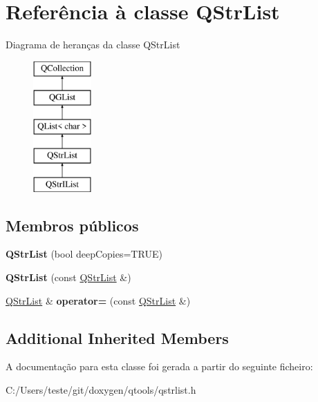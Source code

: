 \hypertarget{class_q_str_list}{\section{Referência à classe Q\-Str\-List}
\label{class_q_str_list}
}
Diagrama de heranças da classe Q\-Str\-List\begin{figure}[H]
\begin{center}
\leavevmode
\includegraphics[height=5.000000cm]{class_q_str_list}
\end{center}
\end{figure}
\subsection*{Membros públicos}
\begin{DoxyCompactItemize}
\item 
\hypertarget{class_q_str_list_ad8d73df8f9e1af4f6f048bbc94b7200c}{{\bfseries Q\-Str\-List} (bool deep\-Copies=T\-R\-U\-E)}\label{class_q_str_list_ad8d73df8f9e1af4f6f048bbc94b7200c}

\item 
\hypertarget{class_q_str_list_aa8804f456706a2405532d0fd797b6795}{{\bfseries Q\-Str\-List} (const \hyperlink{class_q_str_list}{Q\-Str\-List} \&)}\label{class_q_str_list_aa8804f456706a2405532d0fd797b6795}

\item 
\hypertarget{class_q_str_list_a820ad1895d46cfc1616863ea9f34f89a}{\hyperlink{class_q_str_list}{Q\-Str\-List} \& {\bfseries operator=} (const \hyperlink{class_q_str_list}{Q\-Str\-List} \&)}\label{class_q_str_list_a820ad1895d46cfc1616863ea9f34f89a}

\end{DoxyCompactItemize}
\subsection*{Additional Inherited Members}


A documentação para esta classe foi gerada a partir do seguinte ficheiro\-:\begin{DoxyCompactItemize}
\item 
C\-:/\-Users/teste/git/doxygen/qtools/qstrlist.\-h\end{DoxyCompactItemize}
